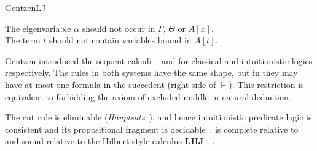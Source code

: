 \begin{entry}{GentzenLJ}
\begin{calculus}
\centering
The eigenvariable $\alpha$ should not occur in $\Gamma$, $\Theta$ or $A[x]$. \\ 
The term $t$ should not contain variables bound in $A[t]$.
\end{calculus}


\begin{clarifications}
Gentzen introduced the sequent calculi \LK~ and \LJ for
classical and intuitionistic logics respectively. The rules in both systems
have the same shape, but in \LJ they may have at most one formula in the
succedent (right side of $\vdash$).
%
This restriction is equivalent to
forbidding the axiom of excluded middle in natural deduction.
\end{clarifications}


\newcommand{\LHJ}{\ensuremath{\mathbf{LHJ}}\xspace}

\begin{technicalities}
The cut rule is eliminable (\emph{Hauptsatz}~\cite{Gentzen1935}), and hence
intuitionistic predicate logic is consistent and its propositional fragment is
decidable~\cite{Gentzen1935a}. \LJ is complete relative to \NJ~
and sound relative to the Hilbert-style calculus
\LHJ~~\cite{Gentzen1935a}.
\end{technicalities}


\end{entry}
